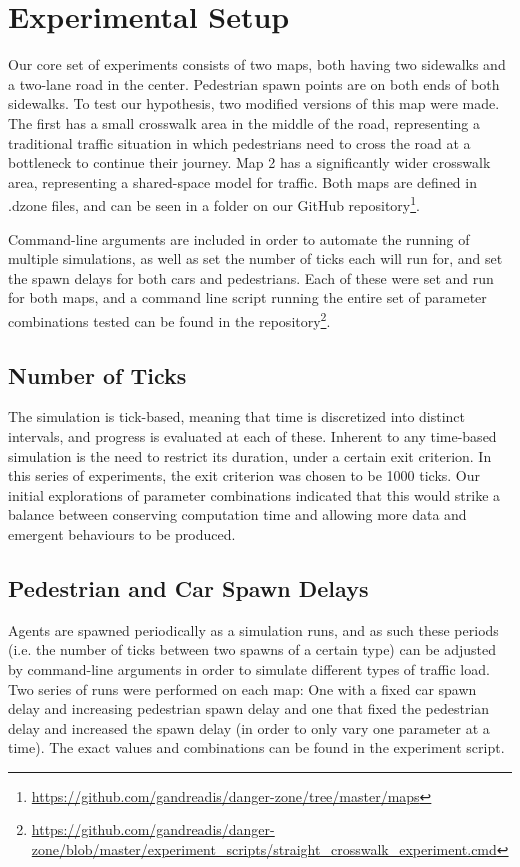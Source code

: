 \chapter{Experimental Setup} \label{chap:setup}

Our core set of experiments consists of two maps, both having two sidewalks and a two-lane road in the center. Pedestrian spawn points are on both ends of both sidewalks. To test our hypothesis, two modified versions of this map were made. The first has a small crosswalk area in the middle of the road, representing a traditional traffic situation in which pedestrians need to cross the road at a bottleneck to continue their journey. Map 2 has a significantly wider crosswalk area, representing a shared-space model for traffic. Both maps are defined in .dzone files, and can be seen in a folder on our GitHub repository\footnote{\url{https://github.com/gandreadis/danger-zone/tree/master/maps}}.

Command-line arguments are included in order to automate the running of multiple simulations, as well as set the number of ticks each will run for, and set the spawn delays for both cars and pedestrians.  Each of these were set and run for both maps, and a command line script running the entire set of parameter combinations tested can be found in the repository\footnote{\url{https://github.com/gandreadis/danger-zone/blob/master/experiment_scripts/straight_crosswalk_experiment.cmd}}.

\section{Number of Ticks}
The simulation is tick-based, meaning that time is discretized into distinct intervals, and progress is evaluated at each of these. Inherent to any time-based simulation is the need to restrict its duration, under a certain exit criterion. In this series of experiments, the exit criterion was chosen to be 1000 ticks. Our initial explorations of parameter combinations indicated that this would strike a balance between conserving computation time and allowing more data and emergent behaviours to be produced.

\section{Pedestrian and Car Spawn Delays}
Agents are spawned periodically as a simulation runs, and as such these periods (i.e. the number of ticks between two spawns of a certain type) can be adjusted by command-line arguments in order to simulate different types of traffic load. Two series of runs were performed on each map: One with a fixed car spawn delay and increasing pedestrian spawn delay and one that fixed the pedestrian delay and increased the spawn delay (in order to only vary one parameter at a time). The exact values and combinations can be found in the experiment script.

